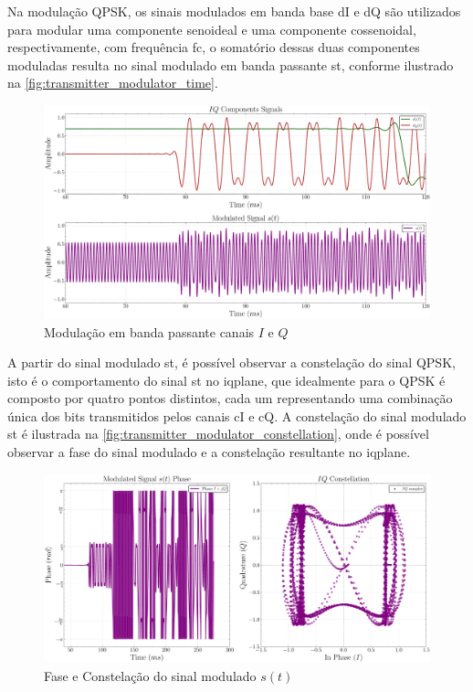 Na modulação \gls{QPSK}, os sinais modulados em banda base \gls{dI} e \gls{dQ} são utilizados para modular uma componente senoideal e uma componente cossenoidal, respectivamente, com frequência \gls{fc}, o somatório dessas duas componentes moduladas resulta no sinal modulado em banda passante \gls{st}, conforme ilustrado na \autoref{fig:transmitter_modulator_time}.

\begin{figure}[H]
	\centering
	\caption{Modulação em banda passante canais $I$ e $Q$}\label{fig:transmitter_modulator_time}
	\includegraphics[width=\linewidth]{assets/cap3/transmitter_modulator_time.pdf}
\end{figure}

A partir do sinal modulado \gls{st}, é possível observar a constelação do sinal \gls{QPSK}, isto é o comportamento do sinal \gls{st} no \gls{iqplane}, que idealmente para o \gls{QPSK} é composto por quatro pontos distintos, cada um representando uma combinação única dos bits transmitidos pelos canais \gls{cI} e \gls{cQ}. A constelação do sinal modulado \gls{st} é ilustrada na \autoref{fig:transmitter_modulator_constellation}, onde é possível observar a fase do sinal modulado e a constelação resultante no \gls{iqplane}.


\begin{figure}[H]
	\centering
	\caption{Fase e Constelação do sinal modulado $s(t)$}\label{fig:transmitter_modulator_constellation}
	\includegraphics[width=\linewidth]{assets/cap3/transmitter_modulator_constellation.pdf}
\end{figure}


